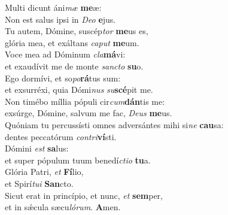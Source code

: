 \evenverse Multi dicunt áni\textit{mæ} \textbf{me}æ:~\*\\
\evenverse Non est salus ipsi in \textit{De}\textit{o} \textbf{e}jus.\\
\oddverse Tu autem, Dómine, suscép\textit{tor} \textbf{me}us es,~\*\\
\oddverse glória mea, et exáltans \textit{ca}\textit{put} \textbf{me}um.\\
\evenverse Voce mea ad Dóminum \textit{cla}\textbf{má}vi:~\*\\
\evenverse et exaudívit me de monte \textit{san}\textit{cto} \textbf{su}o.\\
\oddverse Ego dormívi, et so\textit{po}\textbf{rá}tus sum:~\*\\
\oddverse et exsurréxi, quia Dómi\textit{nus} \textit{su}\textbf{scé}pit me.\\
\evenverse Non timébo míllia pópuli cir\textit{cum}\textbf{dán}tis me:~\*\\
\evenverse exsúrge, Dómine, salvum me fac, \textit{De}\textit{us} \textbf{me}us.\\
\oddverse Quóniam tu percussísti omnes adversántes mihi si\textit{ne} \textbf{cau}sa:~\*\\
\oddverse dentes peccatórum \textit{con}\textit{tri}\textbf{ví}sti.\\
\evenverse Dómini \textit{est} \textbf{sa}lus:~\*\\
\evenverse et super pópulum tuum benedí\textit{cti}\textit{o} \textbf{tu}a.\\
\oddverse Glória Patri, \textit{et} \textbf{Fí}lio,~\*\\
\oddverse et Spirí\textit{tu}\textit{i} \textbf{San}cto.\\
\evenverse Sicut erat in princípio, et nunc, \textit{et} \textbf{sem}per,~\*\\
\evenverse et in sǽcula sæcu\textit{ló}\textit{rum}. \textbf{A}men.\\
